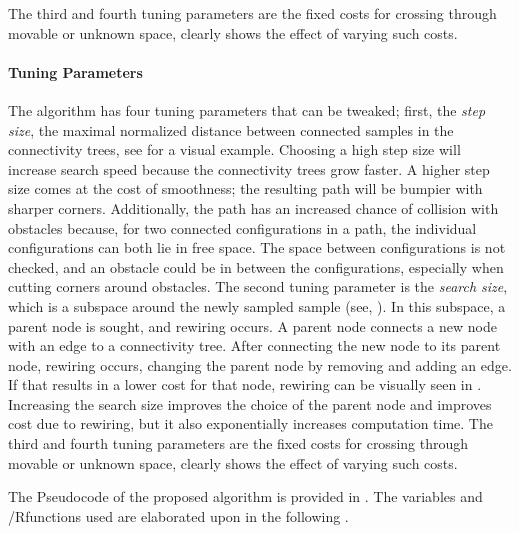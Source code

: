  The third and fourth tuning parameters are the fixed costs for crossing through movable or unknown space,  clearly shows the effect of varying such costs.



\paragraph{Tuning Parameters}



The algorithm has four tuning parameters that can be tweaked; first, the \textit{step size}, the maximal normalized distance between connected samples in the connectivity trees, see  for a visual example. Choosing a high step size will increase search speed because the connectivity trees grow faster. A higher step size comes at the cost of smoothness; the resulting path will be bumpier with sharper corners. Additionally, the path has an increased chance of collision with obstacles because, for two connected configurations in a path, the individual configurations can both lie in free space. The space between configurations is not checked, and an obstacle could be in between the configurations, especially when cutting corners around obstacles. The second tuning parameter is the \textit{search size}, which is a subspace around the newly sampled sample (see, ). In this subspace, a parent node is sought, and rewiring occurs. A parent node connects a new node with an edge to a connectivity tree. After connecting the new node to its parent node, rewiring occurs, changing the parent node by removing and adding an edge. If that results in a lower cost for that node, rewiring can be visually seen in . Increasing the search size improves the choice of the parent node and improves cost due to rewiring, but it also exponentially increases computation time. The third and fourth tuning parameters are the fixed costs for crossing through movable or unknown space,  clearly shows the effect of varying such costs.\bs

The Pseudocode of the proposed algorithm is provided in . The variables and /Rfunctions used are elaborated upon in the following .\bs

